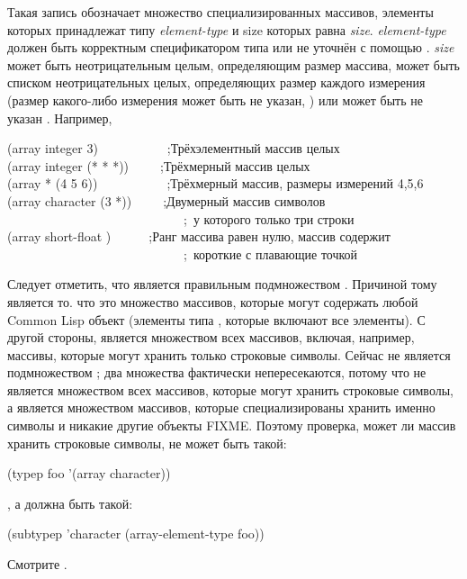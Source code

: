 \begin{flushdesc}
\item[\cd{(array \emph{element-type} \emph{size})}]
  Такая запись обозначает множество специализированных массивов, элементы которых
  принадлежат типу \emph{element-type} и size которых равна \emph{size}.
  \emph{element-type} должен быть корректным спецификатором типа или не уточнён с
  помощью \cdf{*}.
  \emph{size} может быть неотрицательным целым, определяющим размер массива,
  может быть списком неотрицательных целых, определяющих размер каждого измерения
  (размер какого-либо измерения может быть не указан, \cdf{*}) или может быть не
  указан \cdf{*}.
  Например,
  \begin{lisp}
    (array integer 3)~~~~~~~~~~~;\textrm{Трёхэлементный массив целых} \\
    (array integer (* * *))~~~~~;\textrm{Трёхмерный массив целых} \\
    (array * (4 5 6))~~~~~~~~~~~;\textrm{Трёхмерный массив, размеры измерений
      4,5,6} \\
    (array character (3 *))~~~~~;\textrm{Двумерный массив символов} \\
    ~~~~~~~~~~~~~~~~~~~~~~~~~~~~;~\textrm{у которого только три строки} \\
    (array short-float {\emptylist})~~~~~~;\textrm{Ранг массива равен нулю, массив содержит} \\
    ~~~~~~~~~~~~~~~~~~~~~~~~~~~~;~\textrm{короткие с плавающие точкой}
  \end{lisp}
  Следует отметить, что  является правильным подмножеством
  .
  Причиной тому является то. что  это множество массивов, которые
  могут содержать любой Common Lisp объект (элементы типа , которые включают
  все элементы). С другой стороны,  является множеством всех
  массивов, включая, например, массивы, которые могут хранить только строковые
  символы. Сейчас  не является подмножеством ;
  два множества фактически непересекаются, потому что  не
  является множеством всех массивов, которые могут хранить строковые символы, а
  является множеством массивов, которые специализированы хранить именно символы и
  никакие другие объекты FIXME. Поэтому проверка, может ли массив  хранить
  строковые символы, не может быть такой:
  \begin{lisp}
    (typep foo '(array character))
  \end{lisp}
  , а должна быть такой:
  \begin{lisp}
    (subtypep 'character (array-element-type foo))
  \end{lisp}
  Смотрите .


\end{flushdesc}
